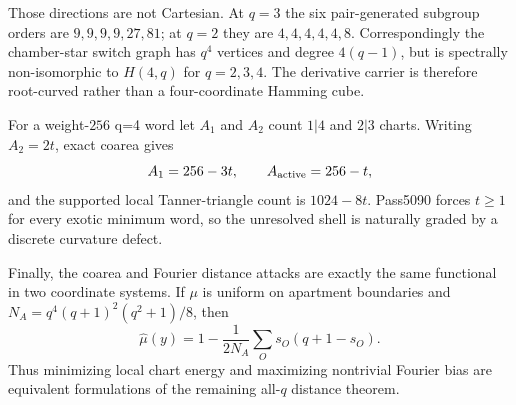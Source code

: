 Those directions are not Cartesian.  At $q=3$ the six pair-generated subgroup orders are $9,9,9,9,27,81$; at $q=2$ they are $4,4,4,4,4,8$.  Correspondingly the chamber-star switch graph has $q^4$ vertices and degree $4(q-1)$, but is spectrally non-isomorphic to $H(4,q)$ for $q=2,3,4$.  The derivative carrier is therefore root-curved rather than a four-coordinate Hamming cube.

For a weight-$256$ q=4 word let $A_1$ and $A_2$ count $1|4$ and $2|3$ charts.  Writing $A_2=2t$, exact coarea gives
\[
 A_1=256-3t,\qquad A_{\rm active}=256-t,
\]
and the supported local Tanner-triangle count is $1024-8t$.  Pass5090 forces $t\ge1$ for every exotic minimum word, so the unresolved shell is naturally graded by a discrete curvature defect.

Finally, the coarea and Fourier distance attacks are exactly the same functional in two coordinate systems.  If $\mu$ is uniform on apartment boundaries and $N_A=q^4(q+1)^2(q^2+1)/8$, then
\[
 \widehat\mu(y)=1-\frac{1}{2N_A}\sum_O s_O(q+1-s_O).
\]
Thus minimizing local chart energy and maximizing nontrivial Fourier bias are equivalent formulations of the remaining all-$q$ distance theorem.
\fi
%
